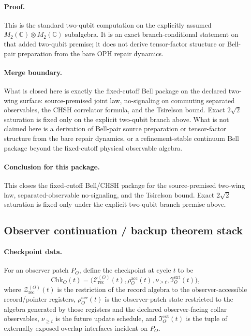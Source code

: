 \documentclass[11pt]{article}
\begin{document}
\paragraph{Proof.}
This is the standard two-qubit computation on the explicitly assumed
\(M_2(\mathbb C)\otimes M_2(\mathbb C)\) subalgebra. It is an exact branch-conditional statement
on that added two-qubit premise; it does not derive tensor-factor structure or Bell-pair
preparation from the bare OPH repair dynamics.

\paragraph{Merge boundary.}
What is closed here is exactly the fixed-cutoff Bell package on the declared two-wing surface:
source-premised joint law, no-signaling on commuting separated observables, the CHSH correlator
formula, and the Tsirelson bound. Exact \(2\sqrt2\) saturation is fixed only on the explicit
two-qubit branch above. What is not claimed here is a derivation of Bell-pair source preparation
or tensor-factor structure from the bare repair dynamics, or a refinement-stable continuum Bell
package beyond the fixed-cutoff physical observable algebra.

\paragraph{Conclusion for this package.}
This closes the fixed-cutoff Bell/CHSH package for the source-premised two-wing law,
separated-observable no-signaling, and the Tsirelson bound. Exact \(2\sqrt2\) saturation is
fixed only under the explicit two-qubit branch premise above.

\subsection{Observer continuation / backup theorem stack}

\paragraph{Checkpoint data.}
For an observer patch $P_O$, define the checkpoint at cycle $t$ to be
\begin{equation}
\mathrm{Chk}_O(t)
=
\bigl(
\mathcal Z_{\mathrm{rec}}^{(O)}(t),
\rho_O^{\mathrm{acc}}(t),
\nu_{\ge t},
\mathfrak I_O^{\mathrm{ext}}(t)
\bigr),
\end{equation}
where $\mathcal Z_{\mathrm{rec}}^{(O)}(t)$ is the restriction of the record algebra to the
observer-accessible record/pointer registers, $\rho_O^{\mathrm{acc}}(t)$ is the observer-patch
state restricted to the algebra generated by those registers and the declared observer-facing
collar observables, $\nu_{\ge t}$ is the future update schedule, and
$\mathfrak I_O^{\mathrm{ext}}(t)$ is the tuple of externally exposed overlap interfaces incident
on $P_O$.
\end{document}
